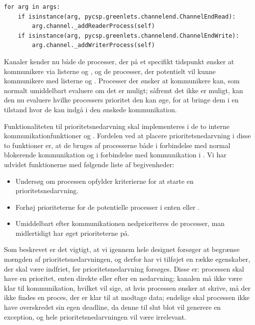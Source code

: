 \begin{lstlisting}[firstnumber=29 ,float=hbtp, label=lst:process-init, caption=Uddrag af \code{Process}' \code{\_\_init\_\_}funktion]
for arg in args:
    if isinstance(arg, pycsp.greenlets.channelend.ChannelEndRead):
        arg.channel._addReaderProcess(self)
    if isinstance(arg, pycsp.greenlets.channelend.ChannelEndWrite):
        arg.channel._addWriterProcess(self)  
\end{lstlisting}

Kanaler kender nu  både de processer, der på et specifikt tidspunkt ønsker at kommunikere via listerne  og , og de processer, der potentielt vil kunne kommunikere med listerne  og . Processer der ønsker at kommunikere kan, som normalt umiddelbart evaluere om det er muligt; såfremt det ikke er muligt, kan den nu evaluere hvilke processers prioritet den kan øge, for at bringe dem i en tilstand hvor de kan indgå i den ønskede kommunikation. 

Funktionaliteten til prioritetsnedarvning skal implementeres i de to interne kommunikationfunktioner   og . Fordelen ved at placere prioritetsnedarvning i disse to funktioner er, at de bruges af processerne både i forbindelse med normal blokerende kommunikation og i forbindelse med kommunikation i . Vi har udvidet funktionerne med følgende liste af begivenheder:
\begin{itemize}
\tightlist
	\item Undersøg om processen opfylder kriterierne for at starte en prioritetsnedarvning.
	\item Forhøj prioriteterne for de potentielle processer i enten  eller .
	\item Umiddelbart efter kommunikationen nedprioriteres de processer, man midlertidigt har øget prioriteterne på.
\end{itemize}

Som beskrevet er det vigtigt, at vi igennem hele designet forsøger at begrænse mængden af prioritetsnedarvningen, og derfor har vi tilføjet en række egenskaber, der skal være indfriet, før prioritetsnedarvning forsøges. Disse er: processen skal have en prioritet, enten direkte eller efter en nedarvning; kanalen må ikke være klar til kommunikation, hvilket vil sige, at hvis processen ønsker at skrive, må der ikke findes en proces, der er klar til at modtage data; endelige skal processen ikke have overskredet sin egen deadline, da denne til slut blot vil generere en exception, og hele prioritetsnedarvningen vil være irrelevant.

